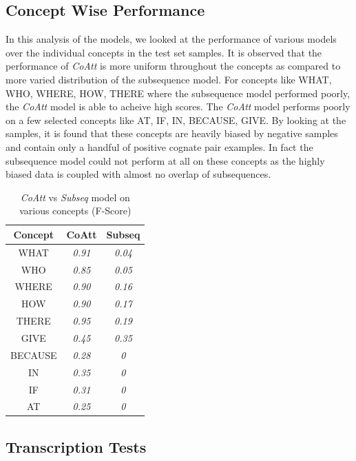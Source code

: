 \documentclass[11pt,letterpaper]{article}
\begin{document}
\subsection{Concept Wise Performance}

In this analysis of the models, we looked at the performance of various models over the individual concepts in the test set samples. It is observed that the performance of \textit{CoAtt} is more uniform throughout the concepts as compared to more varied distribution of the subsequence model. For concepts like WHAT, WHO, WHERE, HOW, THERE where the subsequence model performed poorly, the \textit{CoAtt} model is able to acheive high scores. The \textit{CoAtt} model performs poorly on a few selected concepts like AT, IF, IN, BECAUSE, GIVE. By looking at the samples, it is found that these concepts are heavily biased by negative samples and contain only a handful of positive cognate pair examples. In fact the subsequence model could not perform at all on these concepts as the highly biased data is coupled with almost no overlap of subsequences.

\begin{table}[h]
\centering
\begin{tabular}{ccc}
\textbf{Concept} & \textbf{CoAtt} & \textbf{Subseq} \\ \hline
WHAT             & \textit{0.91}  & \textit{0.04}   \\
WHO              & \textit{0.85}  & \textit{0.05}   \\
WHERE            & \textit{0.90}  & \textit{0.16}   \\
HOW              & \textit{0.90}  & \textit{0.17}   \\
THERE            & \textit{0.95}  & \textit{0.19}  \\
GIVE             & \textit{0.45}  & \textit{0.35}  \\
BECAUSE          & \textit{0.28}  & \textit{0}      \\
IN               & \textit{0.35}  & \textit{0}      \\
IF               & \textit{0.31}  & \textit{0}      \\
AT               & \textit{0.25}  & \textit{0}      
\end{tabular}
\caption{\textit{CoAtt} vs \textit{Subseq} model on various concepts (F-Score)}
\end{table}

\subsection{Transcription Tests}
\end{document}
